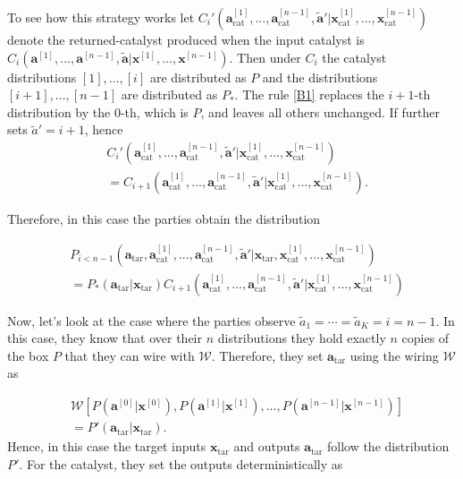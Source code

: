 \documentclass[pra,aps,reprint,superscriptaddress]{revtex4-2}
\theoremstyle{theorem}
\begin{document}
To see how this strategy works let $C_i'\left( \mathbf{a}^{[1]}_{\mathrm{cat}},...,\mathbf{a}^{[n-1]}_{\mathrm{cat}},\mathbf{\tilde a}' \big| \mathbf{x}^{[1]}_{\mathrm{cat}},...,\mathbf{x}^{[n-1]}_{\mathrm{cat}}\right)$ denote the returned-catalyst produced when the input catalyst is $C_i\left( \mathbf{a}^{[1]},...,\mathbf{a}^{[n-1]},\mathbf{\tilde a} \big| \mathbf{x}^{[1]},..., \mathbf{x}^{[n-1]}\right)$. Then under $C_i$ the catalyst distributions $[1],\ldots,[i]$ are distributed as $P$ and the distributions $[i+1],\ldots,[n-1]$ are distributed as $P_*$. The rule \eqref{B1} replaces the $i+1$-th distribution by the $0$-th, which is $P$, and leaves all others unchanged. If further sets $\tilde a'=i+1$, hence
\begin{align}\nonumber
&C_i'\left( \mathbf{a}^{[1]}_{\mathrm{cat}},...,\mathbf{a}^{[n-1]}_{\mathrm{cat}},\mathbf{\tilde a}' \big| \mathbf{x}^{[1]}_{\mathrm{cat}},...,\mathbf{x}^{[n-1]}_{\mathrm{cat}}\right)\\&=C_{i+1}\left( \mathbf{a}^{[1]}_{\mathrm{cat}},...,\mathbf{a}^{[n-1]}_{\mathrm{cat}},\mathbf{\tilde a}' \big| \mathbf{x}^{[1]}_{\mathrm{cat}},...,\mathbf{x}^{[n-1]}_{\mathrm{cat}}\right).
\end{align}

Therefore, in this case the parties obtain the distribution

\begin{align}\nonumber
    &P_{i<n-1}\left(\mathbf{a}_{\mathrm{tar}}, \mathbf{a}^{[1]}_{\mathrm{cat}},...,\mathbf{a}^{[n-1]}_{\mathrm{cat}},\mathbf{\tilde a}' \big|\mathbf{x}_{\mathrm{tar}}, \mathbf{x}^{[1]}_{\mathrm{cat}},...,\mathbf{x}^{[n-1]}_{\mathrm{cat}} \right)
    \\\nonumber &= P_{*}\left(\mathbf{a}_{\mathrm{tar}}|\mathbf{x}_{\mathrm{tar}}\right) C_{i+1}\left(\mathbf{a}^{[1]}_{\mathrm{cat}},...,\mathbf{a}^{[n-1]}_{\mathrm{cat}},\mathbf{\tilde a}' \big| \mathbf{x}^{[1]}_{\mathrm{cat}},...,\mathbf{x}^{[n-1]}_{\mathrm{cat}}\right)
\end{align}


Now, let's look at the case where the parties observe $\tilde a_1=\cdots=\tilde a_K=i=n-1$. In this case, they know that over their $n$ distributions they hold exactly $n$ copies of the box $P$ that they can wire with $\mathcal{W}$. Therefore, they set $\mathbf{a}_{\mathrm{tar}}$ using the wiring $\mathcal{W}$ as

\begin{align}\nonumber
    &\mathcal{W}\left[P\left(\mathbf{a}^{[0]}|\mathbf{x}^{[0]}\right),P\left(\mathbf{a}^{[1]}|\mathbf{x}^{[1]}\right),...,P\left(\mathbf{a}^{[n-1]}|\mathbf{x}^{[n-1]}\right)\right] \\&= P'\left(\mathbf{a}_{\mathrm{tar}}|\mathbf{x}_{\mathrm{tar}}\right).
\end{align}
Hence, in this case the target inputs $\mathbf{x}_{\mathrm{tar}}$ and outputs $\mathbf{a}_{\mathrm{tar}}$ follow the distribution $P'$. For the catalyst, they set the outputs deterministically as
\end{document}
